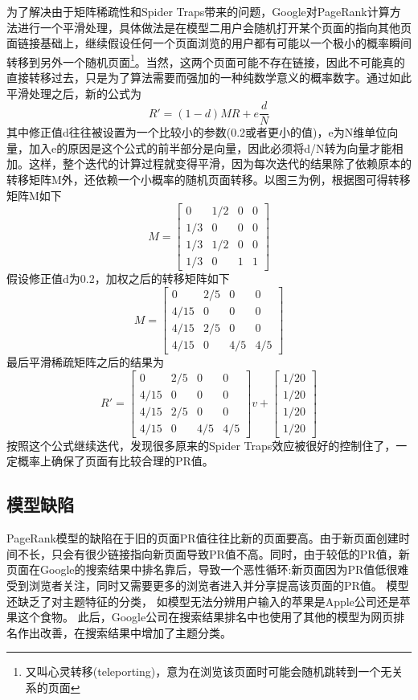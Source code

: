 \documentclass[UTF8
]{ctexart}
\begin{document}
为了解决由于矩阵稀疏性和Spider Traps带来的问题，Google对PageRank计算方法进行一个平滑处理，具体做法是在模型二用户会随机打开某个页面的指向其他页面链接基础上，继续假设任何一个页面浏览的用户都有可能以一个极小的概率瞬间转移到另外一个随机页面\footnote{又叫心灵转移(teleporting)，意为在浏览该页面时可能会随机跳转到一个无关系的页面}。当然，这两个页面可能不存在链接，因此不可能真的直接转移过去，只是为了算法需要而强加的一种纯数学意义的概率数字。通过如此平滑处理之后，新的公式为
\[ {R}'=(1-d)MR+e\frac{d}{N}\]
其中修正值d往往被设置为一个比较小的参数(0.2或者更小的值)，e为N维单位向量，加入e的原因是这个公式的前半部分是向量，因此必须将d/N转为向量才能相加。这样，整个迭代的计算过程就变得平滑，因为每次迭代的结果除了依赖原本的转移矩阵M外，还依赖一个小概率的随机页面转移。以图三为例，根据图可得转移矩阵M如下
\[ M=\begin{bmatrix} 0 & 1/2 & 0 & 0\\ 1/3 & 0 & 0 & 0\\ 1/3 & 1/2 & 0 & 0\\ 1/3 & 0 & 1 & 1 \end{bmatrix}\]
假设修正值d为0.2，加权之后的转移矩阵如下
\[M=\begin{bmatrix} 0 & 2/5 & 0 & 0\\ 4/15 & 0 & 0 & 0\\ 4/15 & 2/5 & 0 & 0\\ 4/15 & 0 & 4/5 & 4/5 \end{bmatrix}\]
最后平滑稀疏矩阵之后的结果为
\[{R}'=\begin{bmatrix} 0 & 2/5 & 0 & 0\\ 4/15 & 0 & 0 & 0\\ 4/15 & 2/5 & 0 & 0\\ 4/15 & 0 & 4/5 & 4/5 \end{bmatrix}v+\begin{bmatrix} 1/20\\ 1/20\\ 1/20\\ 1/20 \end{bmatrix}\]
按照这个公式继续迭代，发现很多原来的Spider Traps效应被很好的控制住了，一定概率上确保了页面有比较合理的PR值。


\hypertarget{header-n94}{%
\subsection{模型缺陷}\label{header-n94}}
PageRank模型的缺陷在于旧的页面PR值往往比新的页面要高。由于新页面创建时间不长，只会有很少链接指向新页面导致PR值不高。同时，由于较低的PR值，新页面在Google的搜索结果中排名靠后，导致一个恶性循环:新页面因为PR值低很难受到浏览者关注，同时又需要更多的浏览者进入并分享提高该页面的PR值。
模型还缺乏了对主题特征的分类， 如模型无法分辨用户输入的苹果是Apple公司还是苹果这个食物。
此后，Google公司在搜索结果排名中也使用了其他的模型为网页排名作出改善，在搜索结果中增加了主题分类。
\end{document}
